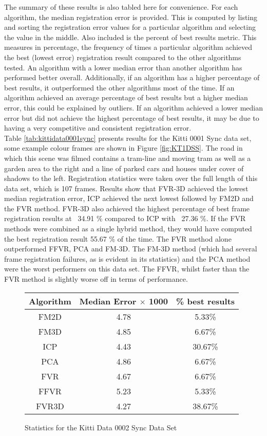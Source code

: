 The summary of these results is also tabled here for convenience. For each algorithm, the median registration error is provided. This is computed by listing and sorting the registration error values for a particular algorithm and selecting the value in the middle. Also included is the percent of best results metric. This measures in percentage, the frequency of times a particular algorithm achieved the best (lowest error) registration result compared to the other algorithms tested. An algorithm with a lower median error than another algorithm has performed better overall. Additionally, if an algorithm has a higher percentage of best results, it outperformed the other algorithms most of the time. If an algorithm achieved an average percentage of best results but a higher median error, this could be explained by outliers. If an algorithm achieved a lower median error but did not achieve the highest percentage of best results, it may be due to having a very competitive and consistent registration error. \\

Table \ref{tab:kittidata0001sync} presents results for the Kitti 0001 Sync data set, some example colour frames are shown in Figure \ref{fig:KT1DSS}. The road in which this scene was filmed contains a tram-line and moving tram as well as a garden area to the right and a line of parked cars and houses under cover of shadows to the left. Registration statistics were taken over the full length of this data set, which is 107 frames. Results show that FVR-3D achieved the lowest median registration error, ICP achieved the next lowest followed by FM2D and the FVR method. FVR-3D also achieved the highest percentage of best frame registration results at ~34.91 \% compared to ICP with ~27.36 \%. If the FVR methods were combined as a single hybrid method, they would have computed the best registration result 55.67 \% of the time. The FVR method alone outperformed FFVR, PCA and FM-3D. The FM-3D method (which had several frame registration failures, as is evident in its statistics) and the PCA method were the worst performers on this data set. The FFVR, whilst faster than the FVR method is slightly worse off in terms of performance. \\ 


\begin{figure}
\centering
\begin{tabular}{ccc}
\hline
\textbf{Algorithm} & \textbf{Median Error $\times$ 1000} & \textbf{\% best results}\\ \hline
FM2D	& 4.78 & 5.33\%\\
FM3D	& 4.85 & 6.67\%\\
ICP	& 4.43 & 30.67\%\\
PCA	& 4.86 & 6.67\%\\
FVR	& 4.67 & 6.67\%\\
FFVR	& 5.23 & 5.33\%\\
FVR3D	& 4.27 & 38.67\%\\
\end{tabular}
\caption{Statistics for the Kitti Data 0002 Sync Data Set}
\label{tab:kittidata0002sync}
\end{figure} 



